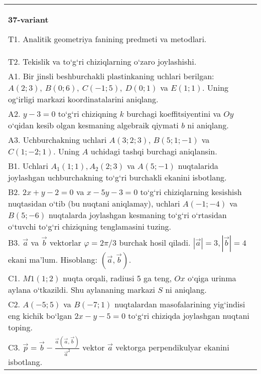 \documentclass{article}
\begin{document}
\begin{tabular}{m{17cm}}
\textbf{37-variant}
\newline

T1. Analitik geometriya fanining predmeti va metodlari.
 \\
T2. 
Tekislik va to‘g‘ri chiziqlarning o‘zaro joylashishi.
 \\
A1. 
Bir jinsli beshburchakli plastinkaning uchlari berilgan:
$A (2;3), \ B (0;6), \ C (-1;5), \ D (0;1) $ va $E (1;1) $. Uning og‘irligi
markazi koordinatalarini aniqlang.
 \\
A2. 
$y-3=0$ to‘g‘ri chiziqning $k$ burchagi
koeffitsiyentini va $Oy$ o‘qidan kesib olgan kesmaning algebraik
qiymati $b$ ni aniqlang.
 \\
A3. 
Uchburchakning uchlari
$A (3;2; 3) $, $B (5;1; - 1) $ va $C (1; -2;1) $. Uning $A$ uchidagi tashqi burchagi aniqlansin.
 \\
B1. 
Uchlari $A_1 (1; 1), A_2 (2; 3) $ va $A (5;-1) $
nuqtalarida joylashgan uchburchakning to‘g‘ri burchakli ekanini isbotlang.
 \\
B2. 
\(2x+y-2=0\) va \(x-5y-3=0\)
to‘g‘ri chiziqlarning kesishish nuqtasidan o‘tib (bu nuqtani aniqlamay), uchlari
\(A (-1;-4) \) va \(B (5;-6) \) nuqtalarda joylashgan kesmaning
to‘g‘ri o‘rtasidan o‘tuvchi to‘g‘ri chiziqning tenglamasini tuzing.
 \\
B3. 
$\vec{a}$ va $\vec{b}$ vektorlar $\varphi = 2\pi/3$ burchak hosil qiladi. $|\vec{a}| = 3,|\vec{b}| = 4$ ekani ma’lum. Hisoblang:
$\left(\vec{a},\vec{b} \right) $.
 \\
C1. 
\(M{1} (1; 2) \) nuqta orqali, radiusi 5 ga teng,
$Ox$ o‘qiga urinma aylana o‘tkazildi. Shu aylananing markazi
$S$ ni aniqlang.
 \\
C2. 
\(A (-5;5) \) va \(B (-7;1) \) nuqtalardan
masofalarining yig‘indisi eng kichik bo‘lgan \(2x - y - 5 = 0\) to‘g‘ri chiziqda
joylashgan nuqtani toping.
 \\
C3. 
\(\vec{p} = \vec{b} - \frac{\vec{a} (\vec{a},\vec{b}) }{{\vec{a}}^{2}}\) vektor \(\vec{a}\) vektorga perpendikulyar ekanini isbotlang.
 \\

\end{tabular}
\vspace{1cm}
\end{document}
